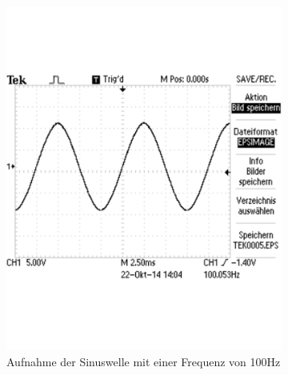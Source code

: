 \documentclass[12pt,a4paper]{article}
\begin{document}
\begin{figure}[H]
        \centering
        \begin{subfigure}[b]{0.48\textwidth}
                \includegraphics[width=\textwidth , scale = 0.4]{2_2_sin_100hz.pdf}
                \caption[Aufnahme der Sinuswelle mit einer Frequenz von 100Hz]{Aufnahme der Sinuswelle mit einer Frequenz von 100Hz}
 				 \label{fig:2_2_sin_100hz}
        \end{subfigure}%
        \hfill
        \begin{subfigure}[b]{0.48\textwidth}

\end{subfigure}
\end{figure}
\end{document}
